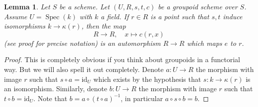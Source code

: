\documentclass{stacks-project}
\theoremstyle{plain}
\newtheorem{lemma}[subsection]{Lemma}
\theoremstyle{definition}
\theoremstyle{remark}
\numberwithin{equation}{subsection}
\def\Spec{\mathop{\mathrm{Spec}}}
\begin{document}
\begin{lemma}
\label{lemma-groupoid-on-field-move-point}
Let $S$ be a scheme. Let $(U, R, s, t, c)$ be a groupoid scheme
over $S$. Assume $U = \Spec(k)$ with $k$ a field.
If $r \in R$ is a point such that $s, t$ induce
isomorphisms $k \to \kappa(r)$, then the map
$$
R \longrightarrow R, \quad
x \longmapsto c(r, x)
$$
(see proof for precise notation) is an automorphism $R \to R$
which maps $e$ to $r$.
\end{lemma}

\begin{proof}
This is completely obvious if you think about groupoids in a
functorial way. But we will also spell it out completely.
Denote $a : U \to R$ the morphism with image $r$ such that
$s \circ a = \text{id}_U$ which exists by the hypothesis
that $s : k \to \kappa(r)$ is an isomorphism. Similarly, denote
$b : U \to R$ the morphism with image $r$ such that
$t \circ b = \text{id}_U$. Note that
$b = a \circ (t \circ a)^{-1}$, in particular
$a \circ s \circ b = b$.


\end{proof}
\end{document}
